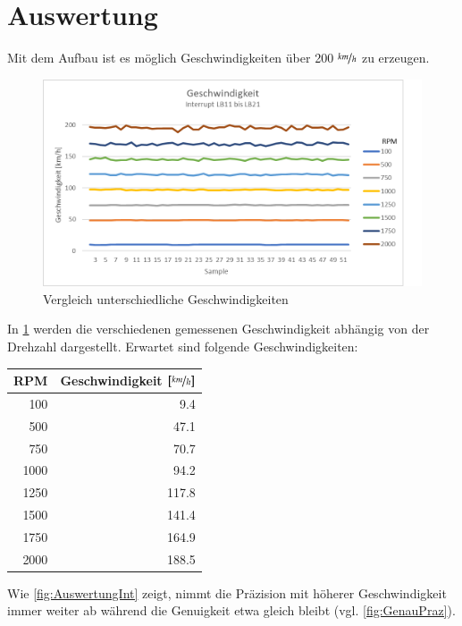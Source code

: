 \section{Auswertung}
Mit dem Aufbau ist es möglich Geschwindigkeiten über 200 $\nicefrac{km}{h}$ zu erzeugen.

\begin{figure}[ht]
    \centering
    \includegraphics[width=\textwidth]{images/auswertungSpeedUeb.png}
    \caption{Vergleich unterschiedliche Geschwindigkeiten}
    \label{fig:AuswertungSpeed}
\end{figure}

In \ref{fig:AuswertungSpeed} werden die verschiedenen gemessenen Geschwindigkeit abhängig von der Drehzahl dargestellt.
Erwartet sind folgende Geschwindigkeiten:
\begin{center}
    \begin{tabular}{rr}
        \textbf{RPM}&\textbf{Geschwindigkeit $\left[\nicefrac{km}{h}\right]$}\\ \hline
        100&9.4\\
        500&47.1\\
        750&70.7\\
        1000&94.2\\
        1250&117.8\\
        1500&141.4\\
        1750&164.9\\
        2000&188.5\\
    \end{tabular}
\end{center}
 Wie \ref{fig:AuswertungInt} zeigt, nimmt die Präzision mit höherer Geschwindigkeit immer weiter ab während die Genuigkeit etwa gleich bleibt (vgl. \ref{fig:GenauPraz}). 

